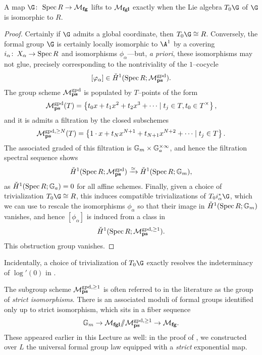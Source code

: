 \begin{lemma}\label{CoordinatizbleFGs}
A map $\G\co \Spec R \to \moduli{fg}$ lifts to $\mathcal{M}_{\mathbf{fgl}}$ exactly when the Lie algebra $T_0 \G$ of $\G$ is isomorphic to $R$.
\end{lemma}
\begin{proof}
Certainly if $\G$ admits a global coordinate, then $T_0 \G \cong R$.  Conversely, the formal group $\G$ is certainly locally isomorphic to $\A^1$ by a covering $i_\alpha\colon\thinspace X_\alpha \to \operatorname{Spec} R$ and isomorphisms $\phi_\alpha$---but, \textit{a priori}, these isomorphisms may not glue, precisely corresponding to the nontriviality of the {\Cech} $1$--cocycle \[[\varphi_\alpha] \in \check{H}^1(\operatorname{Spec} R; \mathcal{M}_{\mathbf{ps}}^{\mathrm{gpd}}).\]  The group scheme $\mathcal{M}_{\mathbf{ps}}^{\mathrm{gpd}}$ is populated by $T$--points of the form \[\mathcal{M}_{\mathbf{ps}}^{\mathrm{gpd}}(T) = \left\{ t_0 x + t_1 x^2 + t_2 x^3 + \cdots \mid t_j \in T, t_0 \in T^\times \right\},\] and it is admits a filtration by the closed subschemes \[\mathcal{M}_{\mathbf{ps}}^{\mathrm{gpd}, \ge N}(T) = \left\{ 1 \cdot x + t_N x^{N+1} + t_{N+1} x^{N+2} + \cdots \mid t_j \in T \right\}.\]  The associated graded of this filtration is $\mathbb G_m \times \mathbb G_a^{\times \infty}$, and hence the filtration spectral sequence shows \[\check{H}^1(\operatorname{Spec} R; \mathcal{M}_{\mathbf{ps}}^{\mathrm{gpd}}) \xrightarrow{\simeq} \check{H}^1(\operatorname{Spec} R; \mathbb G_m),\] as $\check{H}^1(\operatorname{Spec} R; \mathbb G_a) = 0$ for all affine schemes.  Finally, given a choice of trivialization $T_0 \G \cong R$, this induces compatible trivializations of $T_0 i_\alpha^* \G$, which we can use to rescale the isomorphisms $\phi_\alpha$ so that their image in $\check{H}^1(\operatorname{Spec} R; \mathbb G_m)$ vanishes, and hence $[\phi_\alpha]$ is induced from a class in \[\check{H}^1(\operatorname{Spec} R; \mathcal{M}_{\mathbf{ps}}^{\mathrm{gpd}, \ge 1}).\]  This obstruction group vanishes.
\end{proof}

\begin{remark}
Incidentally, a choice of trivialization of $T_0 \G$ exactly resolves the indeterminacy of $\log'(0)$ in .
\end{remark}

\begin{remark}
The subgroup scheme $\mathcal{M}_{\mathbf{ps}}^{\mathrm{gpd}, \ge 1}$ is often referred to in the literature as the group of \textit{strict isomorphisms}.  There is an associated moduli of formal groups identified only up to strict isomorphism, which sits in a fiber sequence \[\mathbb G_m \to \mathcal{M}_{\mathbf{fgl}} /\!\!/ \mathcal{M}_{\mathbf{ps}}^{\mathrm{gpd}, \ge 1} \to \mathcal{M}_{\mathbf{fg}}.\]  These appeared earlier in this Lecture as well: in the proof of , we constructed over $L$ the universal formal group law equipped with a \emph{strict} exponential map.
\end{remark}











